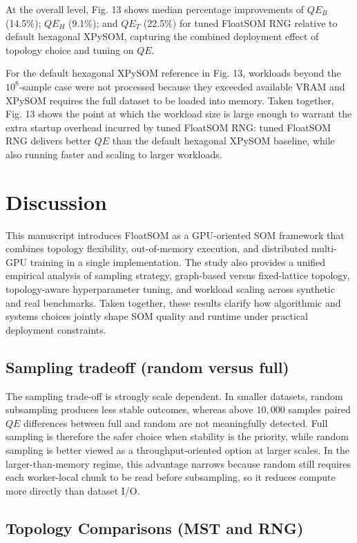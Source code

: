 \documentclass[11pt]{article}
\begin{document}
At the overall level, Fig. 13 shows median percentage improvements of $QE_B$ (14.5\%); $QE_H$ (9.1\%); and $QE_T$ (22.5\%) for tuned FloatSOM RNG relative to default hexagonal XPySOM, capturing the combined deployment effect of topology choice and tuning on $QE$.

For the default hexagonal XPySOM reference in Fig. 13, workloads beyond the $10^8$-sample case were not processed because they exceeded available VRAM and XPySOM requires the full dataset to be loaded into memory. Taken together, Fig. 13 shows the point at which the workload size is large enough to warrant the extra startup overhead incurred by tuned FloatSOM RNG: tuned FloatSOM RNG delivers better $QE$ than the default hexagonal XPySOM baseline, while also running faster and scaling to larger workloads.

\section{Discussion}

This manuscript introduces FloatSOM as a GPU-oriented SOM framework that combines topology flexibility, out-of-memory execution, and distributed multi-GPU training in a single implementation. The study also provides a unified empirical analysis of sampling strategy, graph-based versus fixed-lattice topology, topology-aware hyperparameter tuning, and workload scaling across synthetic and real benchmarks. Taken together, these results clarify how algorithmic and systems choices jointly shape SOM quality and runtime under practical deployment constraints.

\subsection{Sampling tradeoff (random versus full)}

The sampling trade-off is strongly scale dependent. In smaller datasets, random subsampling produces less stable outcomes, whereas above $10{,}000$ samples paired $QE$ differences between full and random are not meaningfully detected. Full sampling is therefore the safer choice when stability is the priority, while random sampling is better viewed as a throughput-oriented option at larger scales. In the larger-than-memory regime, this advantage narrows because random still requires each worker-local chunk to be read before subsampling, so it reduces compute more directly than dataset I/O.

\subsection{Topology Comparisons (MST and RNG)}
\end{document}
